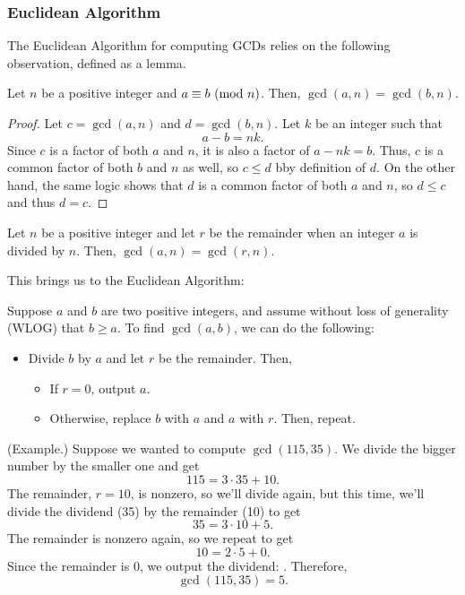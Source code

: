 \documentclass[letterpaper]{article}
\begin{document}
\subsubsection{Euclidean Algorithm}
The Euclidean Algorithm for computing GCDs relies on the following observation, defined as a lemma. 
\begin{lemma}{}{}
    Let $n$ be a positive integer and $a \equiv b \ (\mathrm{mod}\ n)$. Then, $\gcd(a, n) = \gcd(b, n)$. 
\end{lemma}

\begin{proof}
    Let $c = \gcd(a, n)$ and $d = \gcd(b, n)$. Let $k$ be an integer such that \[a - b = nk.\] Since $c$ is a factor of both $a$ and $n$, it is also a factor of $a - nk = b$. Thus, $c$ is a common factor of both $b$ and $n$ as well, so $c \leq d$ bby definition of $d$. On the other hand, the same logic shows that $d$ is a common factor of both $a$ and $n$, so $d \leq c$ and thus $d = c$. 
\end{proof}

\begin{corollary}{}{}
    Let $n$ be a positive integer and let $r$ be the remainder when an integer $a$ is divided by $n$. Then, $\gcd(a, n) = \gcd(r, n)$. 
\end{corollary}

This brings us to the Euclidean Algorithm: 
\begin{mdframed}
    Suppose $a$ and $b$ are two positive integers, and assume without loss of generality (WLOG) that $b \geq a$. To find $\gcd(a, b)$, we can do the following: 
    \begin{itemize}
        \item Divide $b$ by $a$ and let $r$ be the remainder. Then, 
        \begin{itemize}
            \item If $r = 0$, output $a$. 
            \item Otherwise, replace $b$ with $a$ and $a$ with $r$. Then, repeat. 
        \end{itemize}
    \end{itemize}
\end{mdframed}

\begin{mdframed}
    (Example.) Suppose we wanted to compute $\gcd(115, 35)$. We divide the bigger number by the smaller one and get 
    \[115 = 3 \cdot 35 + 10.\]
    The remainder, $r = 10$, is nonzero, so we'll divide again, but this time, we'll divide the dividend (35) by the remainder (10) to get 
    \[35 = 3 \cdot 10 + 5.\]
    The remainder is nonzero again, so we repeat to get 
    \[10 = 2 \cdot 5 + 0.\]
    Since the remainder is 0, we output the dividend: . Therefore, 
    \[\gcd(115, 35) = 5.\]
\end{mdframed}
\end{document}
